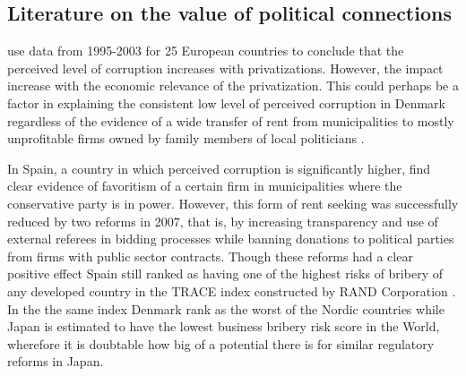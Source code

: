 \label{sec:background}
\subsection{Literature on the value of political connections}
\citet{pena2018privatization} use data from 1995-2003 for 25 European countries to conclude that the perceived level of corruption increases with privatizations. However, the impact increase with the economic relevance of the privatization. This could perhaps be a factor in explaining the consistent low level of perceived corruption in Denmark regardless of the evidence of a wide transfer of rent from municipalities to mostly unprofitable firms owned by family members of local politicians \citep{amore2013value}.

In Spain, a country in which perceived corruption is significantly higher, \citet{albalate2017weakening} find clear evidence of favoritism of a certain firm in municipalities where the conservative party is in power. However, this form of rent seeking was successfully reduced by two reforms in 2007, that is, by increasing transparency and use of external referees in bidding processes while banning donations to political parties from firms with public sector contracts. Though these reforms had a clear positive effect Spain still ranked as having one of the highest risks of bribery of any developed country in the TRACE index constructed by RAND Corporation \citep{stanley2014business}. In the the same index Denmark rank as the worst of the Nordic countries while Japan is estimated to have the  lowest business bribery risk score in the World, wherefore it is doubtable how big of a potential there is for similar regulatory reforms in Japan.


